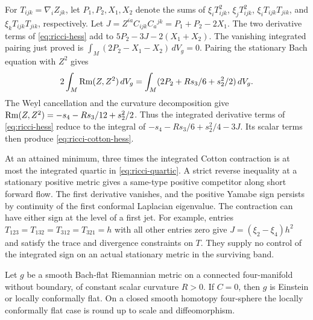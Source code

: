 For \(T_{ijk}=\nabla_iZ_{jk}\), let \(P_1,P_2,X_1,X_2\) denote
the sums of \(\xi_i T_{ijk}^2\), \(\xi_j T_{ijk}^2\),
\(\xi_i T_{ijk}T_{jik}\), and \(\xi_k T_{ijk}T_{jik}\), respectively.
Let \(J=Z^{ia}C_{ijk}C_a{}^{jk}=P_1+P_2-2X_1\).
The two derivative terms of \eqref{eq:ricci-hess} add to
\(5P_2-3J-2(X_1+X_2)\). The vanishing integrated pairing just
proved is \(\int_M(2P_2-X_1-X_2)\,dV_g=0\). Pairing the stationary
Bach equation with \(Z^2\) gives
\[
 2\int_M\operatorname{Rm}(Z,Z^2)\,dV_g
  =\int_M(2P_2+Rs_3/6+s_2^2/2)\,dV_g .
\]
The Weyl cancellation and the curvature decomposition give
\(\operatorname{Rm}(Z,Z^2)=-s_4-Rs_3/12+s_2^2/2\). Thus the integrated
derivative terms of \eqref{eq:ricci-hess} reduce to the integral
of \(-s_4-Rs_3/6+s_2^2/4-3J\). Its scalar terms then produce
\eqref{eq:ricci-cotton-hess}.

At an attained minimum, three times the integrated Cotton
contraction is at most the integrated quartic in
\eqref{eq:ricci-quartic}. A strict reverse inequality at a
stationary positive metric gives a same-type positive competitor
along short forward flow. The first derivative vanishes, and the
positive Yamabe sign persists by continuity of the first conformal
Laplacian eigenvalue. The contraction can have either sign at
the level of a first jet. For example, entries
\(T_{123}=T_{132}=T_{312}=T_{321}=h\) with all other entries zero
give \(J=(\xi_2-\xi_4)h^2\) and satisfy the trace and divergence
constraints on \(T\). They supply no control of the integrated
sign on an actual stationary metric in the surviving band.

\begin{proposition}
\label{prop:cotton-flat-bach}
Let \(g\) be a smooth Bach-flat Riemannian metric on a connected
four-manifold without boundary, of constant scalar curvature
\(R>0\). If \(C=0\), then \(g\) is Einstein or locally
conformally flat. On a closed smooth homotopy four-sphere the
locally conformally flat case is round up to scale and
diffeomorphism.
\end{proposition}

